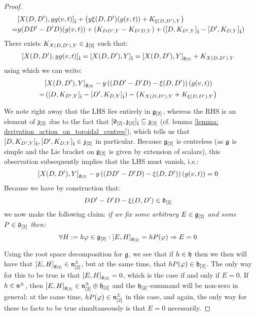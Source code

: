 \begin{proof}
                    $$
                        \begin{aligned}
                            & [ X(D, D') , y g(v, t) ]_{\hat{\mathfrak{t}}} + \left( y \xi(D, D')(g(v, t)) + K_{\xi(D, D'), Y} \right)
                            \\
                            = & y (DD' - D'D)( g(v, t) ) + ( K_{DD', Y} - K_{D'D, Y} ) + ( [ D, K_{D', Y} ]_{\hat{\mathfrak{t}}} - [ D', K_{D, Y} ]_{\hat{\mathfrak{t}}} )
                        \end{aligned}
                    $$
                There exists $K_{X(D, D'), Y} \in \mathfrak{z}_{[2]}$ such that:
                    $$[ X(D, D') , y g(v, t) ]_{\hat{\mathfrak{t}}} = [ X(D, D') , Y ]_{\hat{\mathfrak{t}}} = [X(D, D'), Y]_{\mathfrak{g}_{[2]}} + K_{X(D, D'), Y}$$
                using which we can write:
                    $$
                        \begin{aligned}
                            & [X(D, D'), Y]_{\mathfrak{g}_{[2]}} - y \left( ( DD' - D'D) - \xi(D, D') \right)( g(v, t) )
                            \\
                            = & \left( [ D, K_{D', Y} ]_{\hat{\mathfrak{t}}} - [ D', K_{D, Y} ]_{\hat{\mathfrak{t}}} \right) - \left( K_{X(D, D'), Y} + K_{\xi(D, D'), Y} \right)
                        \end{aligned}
                    $$
                    
                We note right away that the LHS lies entirely in $\mathfrak{g}_{[2]}$, whereas the RHS is an element of $\mathfrak{z}_{[2]}$ due to the fact that $[\mathfrak{d}_{[2]}, \mathfrak{z}_{[2]}]_{\hat{\mathfrak{t}}} \subseteq \mathfrak{z}_{[2]}$ (cf. lemma \ref{lemma: derivation_action_on_toroidal_centres}), which tells us that $[ D, K_{D', Y} ]_{\hat{\mathfrak{t}}}, [ D', K_{D, Y} ]_{\hat{\mathfrak{t}}} \in \mathfrak{z}_{[2]}$ in particular. Because $\mathfrak{g}_{[2]}$ is centreless (as $\mathfrak{g}$ is simple and the Lie bracket on $\mathfrak{g}_{[2]}$ is given by extension of scalars), this observation subsequently implies that the LHS must vanish, i.e.:
                    $$[X(D, D'), Y]_{\mathfrak{g}_{[2]}} - y \left( ( DD' - D'D) - \xi(D, D') \right)( g(v, t) ) = 0$$
                Because we have by construction that:
                    $$DD' - D'D - \xi(D, D') \in \mathfrak{d}_{[2]}$$
                we now make the following claim: \textit{if we fix some arbitrary $E \in \mathfrak{g}_{[2]}$ and some $P \in \mathfrak{d}_{[2]}$ then:}
                    $$\forall H := h \varphi \in \mathfrak{g}_{[2]}: [E, H]_{\mathfrak{g}_{[2]}} = h P( \varphi ) \Rightarrow E = 0$$

                Using the root space decomposition for $\mathfrak{g}$, we see that if $h \in \mathfrak{h}$ then we then will have that $[E, H]_{\mathfrak{g}_{[2]}} \in \mathfrak{n}^{\pm}_{[2]}$, but at the same time, that $h P(\varphi) \in \mathfrak{h}_{[2]}$. The only way for this to be true is that $[E, H]_{\mathfrak{g}_{[2]}} = 0$, which is the case if and only if $E = 0$. If $h \in \mathfrak{n}^{\pm}$, then $[E, H]_{\mathfrak{g}_{[2]}} \in \mathfrak{n}^{\pm}_{[2]} \oplus \mathfrak{h}_{[2]}$ and the $\mathfrak{h}_{[2]}$-summand will be non-zero in general; at the same time, $h P(\varphi) \in \mathfrak{n}^{\pm}_{[2]}$ in this case, and again, the only way for these to facts to be true simultaneously is that $E = 0$ necessarily. 


\end{proof}
